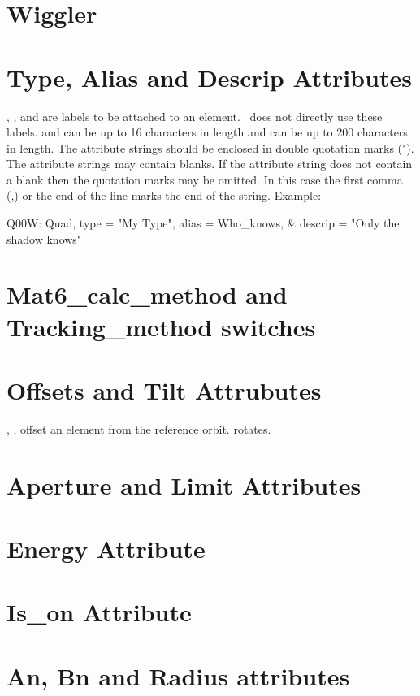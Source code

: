 \section{Wiggler} 
\label{s:wig}

\section{Type, Alias and Descrip Attributes}
\label{s:string}

, , and  are labels to be attached 
to an element. \bmad\ does not directly use these labels. 
and  can be up to 16 characters in length and 
can be up to 200 characters in length. The attribute strings should be
enclosed in double quotation marks ("). The attribute strings may
contain blanks. If the attribute string does not contain a blank then
the quotation marks may be omitted. In this case the first comma (,)
or the end of the line marks the end of the string. Example:
\begin{example}
  Q00W: Quad, type = "My Type", alias = Who_knows, &
                                        descrip = "Only the shadow knows"
\end{example}

\section{Mat6\_calc\_method and Tracking\_method switches}
\label{s:track}


\section{Offsets and Tilt Attrubutes}
\label{s:offset}

, ,  offset an element from the reference orbit.
 rotates.

\section{Aperture and Limit Attributes}
\label{s:limit}

\section{Energy Attribute}
\label{s:energy}

\section{Is\_on Attribute}
\label{s:is_on}

\section{An, Bn and Radius attributes}
\label{s:ab}

